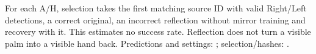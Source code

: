 For each A/H, selection takes the first matching source ID with valid Right/Left detections, a correct original, an incorrect reflection without mirror training and recovery with it. This estimates no success rate. Reflection does not turn a visible palm into a visible hand back. Predictions and settings: ; selection/hashes: .
